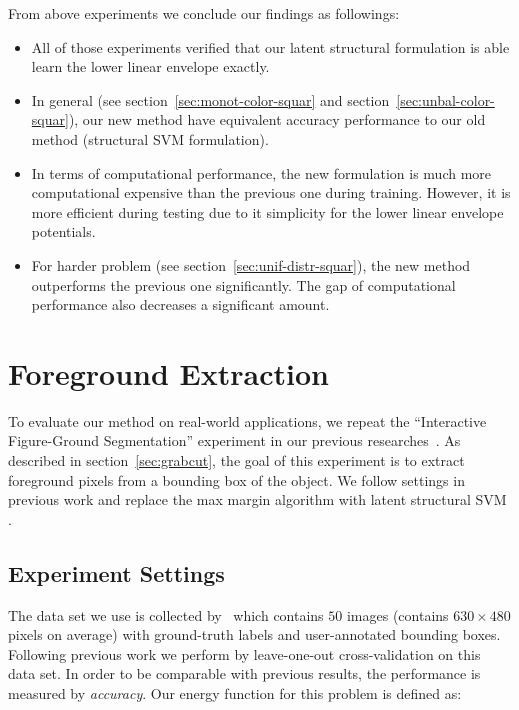 From above experiments we conclude our findings as followings:

\begin{itemize}
\item All of those experiments verified that our latent
  structural formulation is able learn the lower linear envelope
  exactly.
\item In general (see section~\ref{sec:monot-color-squar} and
  section~\ref{sec:unbal-color-squar}), our new method have
  equivalent accuracy performance to our old method (structural
  SVM formulation\cite{Gould:ICML2011,gouldlearning}).
\item In terms of computational performance, the new formulation
  is much more computational expensive than the previous one
  during training. However, it is more efficient during testing
  due to it simplicity for the lower linear envelope potentials.
\item For harder problem (see
  section~\ref{sec:unif-distr-squar}), the new method outperforms
  the previous one significantly. The gap of computational
  performance also decreases a significant amount.
\end{itemize}

\clearpage

\section{Foreground Extraction}
\label{sec:foregr-extr}

To evaluate our method on real-world applications, we repeat the
``Interactive Figure-Ground Segmentation'' experiment in our
previous researches~\cite{gouldlearning,Gould:ICML2011}. As
described in section~\ref{sec:grabcut}, the goal of this
experiment is to extract foreground pixels from a bounding box of
the object. We follow settings in previous work and replace
the max margin algorithm with latent structural SVM
.

\subsection{Experiment Settings}
\label{sec:experiment-settings-grabcut}

The data set we use is collected by~
which contains $50$ images (contains $630\times480$ pixels on
average) with ground-truth labels and user-annotated bounding
boxes. Following previous work we perform
 by leave-one-out cross-validation on this
data set. In order to be comparable with previous results, the
performance is measured by \emph{accuracy}. Our energy function
for this problem is defined as:

